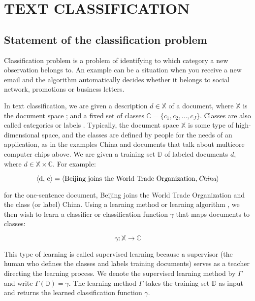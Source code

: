 \chapter{TEXT CLASSIFICATION} \label{chapt1}
\section{Statement of the classification problem} \label{sect1_2}


Classification problem is a problem of identifying to which category a new observation belongs to. An example can be a situation when you receive a new email and the algorithm automatically decides whether it belongs to social network, promotions or business letters.


\newcommand{\docsetlabeled}{\mathbb{D}}

In text classification, we are given a description  $d \in \mathbb{X}$ of a document, where $\mathbb{X}$ is the document space ; and a fixed set of classes  $\mathbb{C} = \{ c_1,c_2,\ldots,c_J \}$. Classes are also called categories or labels . Typically, the document space  $\mathbb{X}$ is some type of high-dimensional space, and the classes are defined by people for the needs of an application, as in the examples China and documents that talk about multicore computer chips above. We are given a training set  $\docsetlabeled$ of labeled documents  $d $, where  $d \in \mathbb{X} \times \mathbb{C}$. For example: 

\begin{equation}
\label{eq:equation3}
\langle\mbox{d, c}\rangle=\langle\mbox{Beijing joins the World Trade Organization}, \emph{China}\rangle
\end{equation}
\begin{doublespacing}
\end{doublespacing}

for the one-sentence document, Beijing joins the World Trade Organization and the class (or label) China.
Using a learning method or learning algorithm , we then wish to learn a classifier or classification function  $\gamma $ that maps documents to classes:

\begin{equation}
	\label{eq:equation4}
	\gamma: \mathbb{X} \rightarrow \mathbb{C}
\end{equation}
\begin{doublespacing}
\end{doublespacing}

This type of learning is called supervised learning because a supervisor (the human who defines the classes and labels training documents) serves as a teacher directing the learning process. We denote the supervised learning method by $\Gamma$ and write  $\Gamma(\docsetlabeled) = \gamma$. The learning method $\Gamma$ takes the training set  $\docsetlabeled$ as input and returns the learned classification function $\gamma $.

